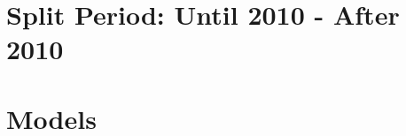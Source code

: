 \chapter{Split Period: Until 2010 - After 2010}\label{appendix:split_period}



\chapter{Models}\label{appendix:models}

\newpage

\newpage

\newpage

\newpage

\newpage

\newpage

\newpage








